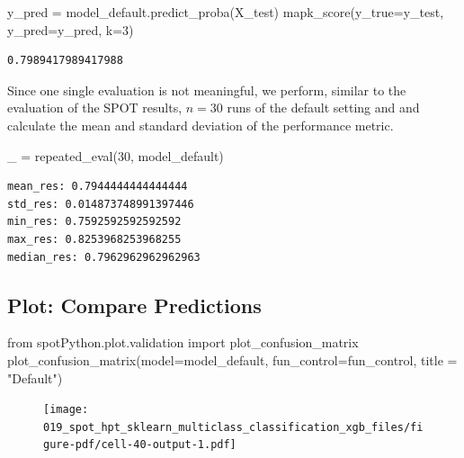 \documentclass[
  letterpaper,
  DIV=11,
  numbers=noendperiod]{scrreprt}
\newenvironment{Shaded}{\begin{snugshade}}{\end{snugshade}}
\newcommand{\DecValTok}[1]{\textcolor[rgb]{0.68,0.00,0.00}{#1}}
\newcommand{\ImportTok}[1]{\textcolor[rgb]{0.00,0.46,0.62}{#1}}
\newcommand{\NormalTok}[1]{\textcolor[rgb]{0.00,0.23,0.31}{#1}}
\newcommand{\OperatorTok}[1]{\textcolor[rgb]{0.37,0.37,0.37}{#1}}
\newcommand{\StringTok}[1]{\textcolor[rgb]{0.13,0.47,0.30}{#1}}
\begin{document}
\begin{Shaded}
\begin{Highlighting}[]
\NormalTok{y\_pred }\OperatorTok{=}\NormalTok{ model\_default.predict\_proba(X\_test)}
\NormalTok{mapk\_score(y\_true}\OperatorTok{=}\NormalTok{y\_test, y\_pred}\OperatorTok{=}\NormalTok{y\_pred, k}\OperatorTok{=}\DecValTok{3}\NormalTok{)}
\end{Highlighting}
\end{Shaded}

\begin{verbatim}
0.7989417989417988
\end{verbatim}

Since one single evaluation is not meaningful, we perform, similar to
the evaluation of the SPOT results, \(n=30\) runs of the default setting
and and calculate the mean and standard deviation of the performance
metric.

\begin{Shaded}
\begin{Highlighting}[]
\NormalTok{\_ }\OperatorTok{=}\NormalTok{ repeated\_eval(}\DecValTok{30}\NormalTok{, model\_default)}
\end{Highlighting}
\end{Shaded}

\begin{verbatim}
mean_res: 0.7944444444444444
std_res: 0.014873748991397446
min_res: 0.7592592592592592
max_res: 0.8253968253968255
median_res: 0.7962962962962963
\end{verbatim}

\hypertarget{plot-compare-predictions-2}{%
\subsection{Plot: Compare
Predictions}\label{plot-compare-predictions-2}}

\begin{Shaded}
\begin{Highlighting}[]
\ImportTok{from}\NormalTok{ spotPython.plot.validation }\ImportTok{import}\NormalTok{ plot\_confusion\_matrix}
\NormalTok{plot\_confusion\_matrix(model}\OperatorTok{=}\NormalTok{model\_default, fun\_control}\OperatorTok{=}\NormalTok{fun\_control, title }\OperatorTok{=} \StringTok{"Default"}\NormalTok{)}
\end{Highlighting}
\end{Shaded}

\begin{figure}[H]

{\centering \texttt{[image: 019\_spot\_hpt\_sklearn\_multiclass\_classification\_xgb\_files/figure-pdf/cell-40-output-1.pdf]}

}

\end{figure}
\end{document}
